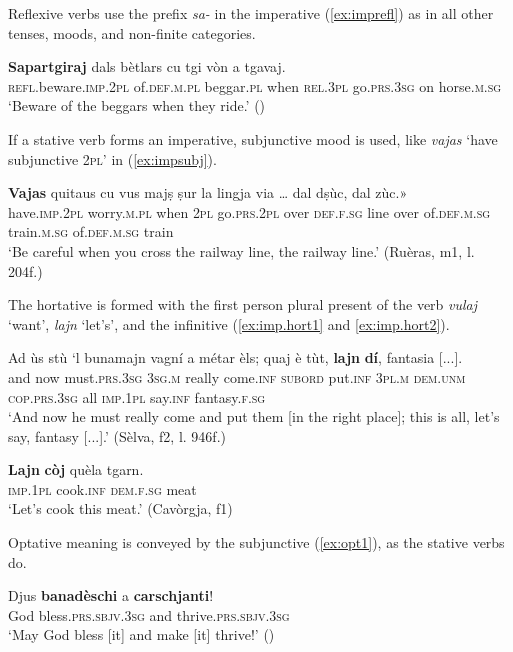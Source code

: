 Reflexive verbs use the prefix \textit{sa-} in the imperative (\ref{ex:imprefl}) as in all other tenses, moods, and non-finite categories.

\ea
\label{ex:imprefl}
\gll  \textbf{Sapartgiraj} dals bètlars cu tgi vòn a tgavaj.  \\
\textsc{refl}.beware.\textsc{imp.2pl} of.\textsc{def.m.pl} beggar.\textsc{pl} when \textsc{rel.3pl} go.\textsc{prs.3sg} on horse.\textsc{m.sg}\\
\glt `Beware of the beggars when they ride.' ()
\z

If a stative verb forms an imperative, subjunctive mood is used, like \textit{vajas} `have subjunctive \textsc{2pl}' in (\ref{ex:impsubj}).

\ea
\label{ex:impsubj}
\gll    \textbf{Vajas} quitaus cu vus majṣ ṣur la lingja via … dal dṣùc, dal zùc.»\\
have.\textsc{imp.2pl} worry.\textsc{m.pl} when \textsc{2pl} go.\textsc{prs.2pl} over \textsc{def.f.sg} line over of.\textsc{def.m.sg} train.\textsc{m.sg} of.\textsc{def.m.sg} train\\
\glt `Be careful when you cross the railway line, the railway line.' (Ruèras, m1, l. 204f.)
\z

The hortative is formed with the first person plural present of the verb \textit{vulaj} `want', \textit{lajn} `let's', and the infinitive (\ref{ex:imp.hort1} and \ref{ex:imp.hort2}).

\ea
\label{ex:imp.hort1}
\gll Ad ùs stù `l bunamajn vagní a métar èls; quaj è tùt, \textbf{lajn} \textbf{dí}, fantasia [...]. \\
and now must.\textsc{prs.3sg} \textsc{3sg.m} really come.\textsc{inf} \textsc{subord} put.\textsc{inf} \textsc{3pl.m} \textsc{dem.unm} \textsc{cop.prs.3sg} all \textsc{imp.1pl} say.\textsc{inf} fantasy.\textsc{f.sg}\\
\glt `And now he must really come and put them [in the right place]; this is all, let’s say, fantasy [...].' (Sèlva, f2, l. 946f.)
\z

\ea
\label{ex:imp.hort2}
\gll \textbf{Lajn} \textbf{còj} quèla tgarn.\\
\textsc{imp.1pl} cook.\textsc{inf} \textsc{dem.f.sg} meat\\
\glt `Let's cook this meat.' (Cavòrgja, f1)
\z

Optative meaning is conveyed by the subjunctive (\ref{ex:opt1}), as the stative verbs do.

\ea
\label{ex:opt1}
\gll Djus \textbf{banadèschi} a \textbf{carschjanti}!\\
God bless.\textsc{prs.sbjv.3sg} and thrive.\textsc{prs.sbjv.3sg}\\
\glt `May God bless [it] and make [it] thrive!' ()
\z


